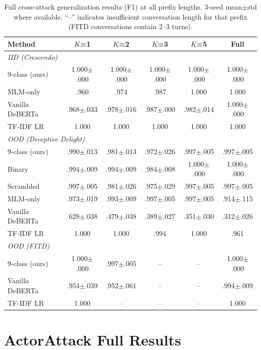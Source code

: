 \begin{table}[t]
\centering
\small
\caption{Full cross-attack generalization results (F1) at all prefix lengths. 3-seed mean$\pm$std where available. ``--'' indicates insufficient conversation length for that prefix (FITD conversations contain 2--3 turns).}
\label{tab:full_prefix}
\begin{tabular}{@{}lccccc@{}}
\toprule
\textbf{Method} & $K$=1 & $K$=2 & $K$=3 & $K$=5 & Full \\
\midrule
\multicolumn{6}{l}{\textit{IID (Crescendo)}} \\[2pt]
9-class (ours) & 1.000$\pm$.000 & 1.000$\pm$.000 & 1.000$\pm$.000 & 1.000$\pm$.000 & 1.000$\pm$.000 \\
MLM-only & .960 & .974 & .987 & 1.000 & 1.000 \\
Vanilla DeBERTa & .968$\pm$.033 & .978$\pm$.016 & .987$\pm$.000 & .982$\pm$.014 & 1.000$\pm$.000 \\
TF-IDF LR & 1.000 & 1.000 & 1.000 & 1.000 & 1.000 \\
\midrule
\multicolumn{6}{l}{\textit{OOD (Deceptive Delight)}} \\[2pt]
9-class (ours) & .990$\pm$.013 & .981$\pm$.013 & .972$\pm$.026 & .997$\pm$.005 & .997$\pm$.005 \\
Binary & .994$\pm$.009 & .994$\pm$.009 & .984$\pm$.008 & 1.000$\pm$.000 & 1.000$\pm$.000 \\
Scrambled & .997$\pm$.005 & .981$\pm$.026 & .975$\pm$.029 & .997$\pm$.005 & .997$\pm$.005 \\
MLM-only & .973$\pm$.019 & .993$\pm$.009 & .997$\pm$.005 & .997$\pm$.005 & .914$\pm$.115 \\
Vanilla DeBERTa & .628$\pm$.038 & .479$\pm$.038 & .389$\pm$.027 & .351$\pm$.030 & .312$\pm$.026 \\
TF-IDF LR & 1.000 & 1.000 & .994 & 1.000 & .961 \\
\midrule
\multicolumn{6}{l}{\textit{OOD (FITD)}} \\[2pt]
9-class (ours) & 1.000$\pm$.000 & .997$\pm$.005 & -- & -- & 1.000$\pm$.000 \\
Vanilla DeBERTa & .954$\pm$.039 & .952$\pm$.061 & -- & -- & .994$\pm$.009 \\
TF-IDF LR & 1.000 & -- & -- & -- & 1.000 \\
\bottomrule
\end{tabular}
\end{table}

\section{ActorAttack Full Results}
\label{sec:actorattack_full}

